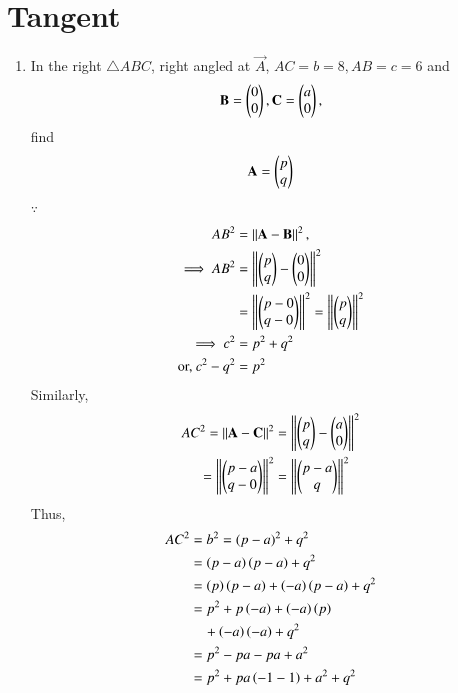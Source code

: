 \documentclass[journal,12pt,twocolumn]{IEEEtran}
\renewcommand\thesection{\arabic{section}}
\begin{document}
\section{Tangent}
\begin{enumerate}[label=\thesection.\arabic*
,ref=\thesection.\theenumi]
\item In the right $\triangle ABC$, right angled at $\vec{A}$, $AC = b = 8, AB=c=6$ and
\begin{align}
\mathbf{B}=\begin{pmatrix}0 \\0\end{pmatrix}, \mathbf{C}=\begin{pmatrix}a \\0\end{pmatrix}, 
\end{align}
%
find 
\begin{align}
\mathbf{A}=\begin{pmatrix}p \\q\end{pmatrix}
\end{align}
\solution $\because$ 
\begin{align}
AB^2 &= \norm{\vec{A}-\vec{B}}^2,
\\
%
\implies AB^2 &= \norm{\myvec{p \\q}-\myvec{0 \\0}}^2 
\\
&=\norm{\myvec{p-0 \\q-0}}^2=\norm{\myvec{p \\q}}^2
\\
\implies c^2 &= p^2+q^2
\\
\text{or, } c^2 -q^2 &= p^2
\label{eq:rt_tang_pair_ab}
\end{align}
%
Similarly,
\begin{align}
AC^2 = \left\Vert\mathbf{A}-\mathbf{C}\right\Vert^2 &= \left\Vert\begin{pmatrix}p \\q\end{pmatrix}-\begin{pmatrix}a \\0\end{pmatrix}\right\Vert^2 
\\
=\left\Vert\begin{pmatrix}p-a \\q-0\end{pmatrix}\right\Vert^2&=\left\Vert\begin{pmatrix}p-a \\q\end{pmatrix}\right\Vert^2
\end{align}
Thus, 
\begin{align}
AC^2 &=b^2 = (p-a)^2+q^2 
\nonumber \\
&= \brak{p-a}\brak{p-a}+q^2
\nonumber \\
&=\brak{p}\brak{p-a}+\brak{-a}\brak{p-a}+q^2 
\nonumber \\
&=p^2 +p\brak{-a} +\brak{-a}\brak{ p} 
\\
&\quad +\brak{-a}\brak{-a} + q^2
\nonumber \\
&= p^2 -pa -pa +a^2 
\nonumber \\
&= p^2 +pa\brak{-1-1}+a^2 + q^2
\nonumber \\

\end{align}
\end{enumerate}
\end{document}
